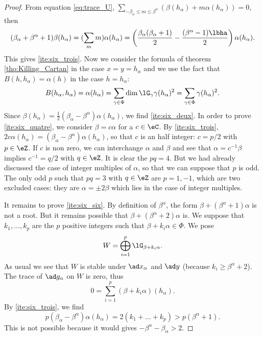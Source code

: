 \begin{proof}
From equation \eqref{eq:trace_U}, $\sum_{-\beta_{\alpha}\leq m\leq\beta^{\alpha}}( \beta(h_{\alpha})+m\alpha(h_{\alpha}) )=0$, then
\begin{equation}
(\beta_{\alpha}+\beta^{\alpha}+1)\beta(h_{\alpha})=(\sum_m m)\alpha(h_{\alpha})\\
                        =\left(
                    \frac{\beta_{\alpha}(\beta_{\alpha}+1)}{2}-\frac{(\beta^{\alpha}-1)\lbha}{2}
                        \right)\alpha(h_{\alpha}).
\end{equation}
This gives \ref{ite:six_trois}. Now we consider the formula of theorem \ref{tho:Killing_Cartan} in the case $x=y=h_{\alpha}$ and we use the fact that $B(h,h_{\alpha})=\alpha(h)$ in the case $h=h_{\alpha}$:
\begin{equation}
B(h_{\alpha},h_{\alpha})=\alpha(h_{\alpha})\\
            =\sum_{\gamma\in\Phi}\dim\lG_{\gamma}\gamma(h_{\alpha})^2\\
            =\sum_{\gamma\in\Phi}\gamma(h_{\alpha})^2.
\end{equation}
Since $\beta(h_{\alpha})=\frac{1}{2}(\beta_{\alpha}-\beta^{\alpha})\alpha(h_{\alpha})$, we find \ref{ite:six_deux}. In order to prove \ref{ite:six_quatre}, we consider $\beta=c\alpha$ for a $c\in\eC$. By \ref{ite:six_trois}, $2c\alpha(h_{\alpha})=(\beta_{\alpha}-\beta^{\alpha})\alpha(h_{\alpha})$, so that $c$ is an half integer: $c=p/2$ with $p\in\eZ$. If $c$ is non zero, we can interchange $\alpha$ and $\beta$ and see that $\alpha=c^{-1}\beta$ implies $c^{-1}=q/2$ with $q\in\eZ$. It is clear the $pq=4$. But we had already discussed the case of integer multiples of $\alpha$, so that we can suppose that $p$ is odd. The only odd $p$ such that $pq=3$ with $q\in\eZ$ are $p=1,-1$, which are two excluded cases: they are $\alpha=\pm 2\beta$ which lies in the case of integer multiples.

It remains to prove \ref{ite:six_six}. By definition of $\beta^{\alpha}$, the form $\beta+(\beta^{\alpha}+1)\alpha$ is not a root. But it remains possible that $\beta+(\beta^{\alpha}+2)\alpha$ is. We suppose that $k_1,\ldots,k_p$ are the $p$ positive integers such that $\beta+k_i\alpha\in\Phi$. We pose
\[
W=\bigoplus_{i=1}^p\lG_{\beta+k_i\alpha}.
\]
As usual we see that $W$ is stable under $\ad x_{\alpha}$ and $\ad y$ (because $k_i\geq\beta^{\alpha}+2$). The trace of $\ad g_{\alpha}$ on $W$ is zero, thus
\begin{equation}
0=\sum_{i=1}^p(\beta+k_i\alpha)(h_{\alpha}).
\end{equation}
By \ref{ite:six_trois}, we find
\[
p(\beta_{\alpha}-\beta^{\alpha})\alpha(h_{\alpha})=2(k_1+\ldots+k_p)>p(\beta^{\alpha}+1). 
\]
This is not possible because it would gives $-\beta^{\alpha}-\beta_{\alpha}>2$.
\end{proof}

